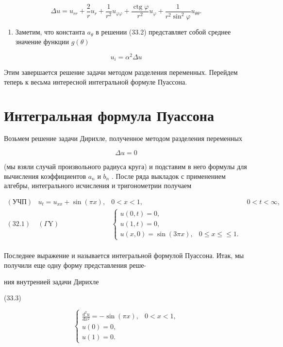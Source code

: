\documentclass[
  ukrainian,
]{article}
\providecommand{\tightlist}{%
  \setlength{\itemsep}{0pt}\setlength{\parskip}{0pt}}
\begin{document}
\[
\Delta u = u_{rr} + \frac{2}{r} u_r + \frac{1}{r^2} u_{\varphi\varphi} + \frac{\operatorname{ctg} \varphi}{r^2} u_{\varphi} + \frac{1}{r^2 \sin^2 \varphi} u_{\theta\theta}.
\]

\begin{enumerate}
\def\labelenumi{\arabic{enumi}.}
\setcounter{enumi}{3}
\tightlist
\item
  Заметим, что константа \(a_{\theta}\) в решении (33.2) представляет
  собой среднее значение функции \(g\left(\theta\right)\)
\end{enumerate}

\[
u_i = \alpha^2 \Delta u
\]

Этим завершается решение задачи методом разделения переменных. Перейдем
теперь к весьма интересной интегральной формуле Пуассона.

\section{Интегральная формула
Пуассона}\label{ux438ux43dux442ux435ux433ux440ux430ux43bux44cux43dux430ux44f-ux444ux43eux440ux43cux443ux43bux430-ux43fux443ux430ux441ux441ux43eux43dux430}

Возьмем решение задачи Дирихле, полученное методом разделения переменных

\[
\Delta u = 0
\]

(мы взяли случай произвольного радиуса круга) и подставим в него формулы
для вычисления коэффициентов \(a_n\) и \(b_n\) . После ряда выкладок с
применением алгебры, интегрального исчисления и тригонометрии получаем

\[
\begin{array}{llll} (\text{УЧП}) & u_t = u_{xx} + \sin{(\pi x)}, & 0 < x < 1, & 0 < t < \infty, \\ (32.1) & (\Gamma \text{Y}) & \begin{cases} u(0, t) = 0, \\ u(1, t) = 0, \\ u(x, 0) = \sin{(3\pi x)}, & 0 \le x \le \le 1. \end{cases} \\ \end{array}
\]

Последнее выражение и называется интегральной формулой Пуассона. Итак,
мы получили еще одну форму представления реше-

ния внутренией задачи Дирихле

(33.3)

\[
\begin{cases} \frac{d^{2}u}{dx^{2}} = -\sin(\pi x), & 0 < x < 1, \\ u(0) = 0, \\ u(1) = 0. \end{cases}
\]
\end{document}
